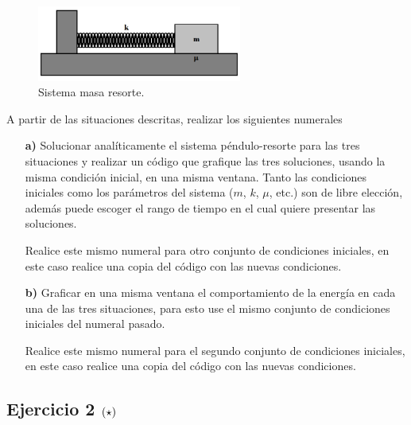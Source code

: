 \begin{figure}[htbp]
	\centering
	\includegraphics[width=0.60\textwidth]
	{./pictures/mass_spring.png}

	\caption{\small{Sistema masa resorte.}}
	
	\label{fig:mass_spring}
\end{figure}


A partir de las situaciones descritas, realizar los siguientes numerales


\begin{itemize}
\item[\textbf{a)}] Solucionar analíticamente el sistema péndulo-resorte 
para las tres situaciones y realizar un código que grafique las tres 
soluciones, usando la misma condición inicial, en una misma ventana. 
Tanto las condiciones iniciales como los parámetros del sistema ($m$, $k$, 
$\mu$, etc.) son de libre elección, además puede escoger el rango de tiempo
en el cual quiere presentar las soluciones.

Realice este mismo numeral para otro conjunto de condiciones iniciales,
en este caso realice una copia del código con las nuevas condiciones.

\item[\textbf{b)}] Graficar en una misma ventana el comportamiento de la 
energía en cada una de las tres situaciones, para esto use el mismo conjunto
de condiciones iniciales del numeral pasado.

Realice este mismo numeral para el segundo conjunto de condiciones 
iniciales, en este caso realice una copia del código con las nuevas 
condiciones.

\end{itemize}


\subsection*{Ejercicio 2 \large{$\left( \star \right)$}}

